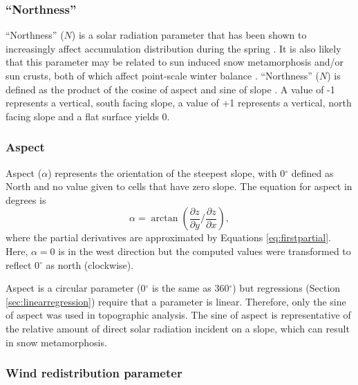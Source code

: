 \documentclass{sfuthesis}
\begin{document}
\subsubsection*{``Northness''} 

``Northness'' ($N$) is a solar radiation parameter that has been shown to  increasingly affect accumulation distribution during the spring \citep{Revuelto2014}. It is also likely that this parameter may be related to sun induced snow metamorphosis and/or sun crusts, both of which affect point-scale winter balance \citep{McGrath2015}. ``Northness'' ($N$) is defined as the product of the cosine of aspect and sine of slope \citep{Molotch2005}. A value of -1 represents a vertical, south facing slope, a value of +1 represents a vertical, north facing slope and a flat surface yields 0. 

\subsubsection*{Aspect} 

Aspect ($\alpha$) represents the orientation of the steepest slope, with 0${^\circ}$ defined as North and no value given to cells that have zero slope. The equation for aspect in degrees is \citep{Neteler2008}
	\begin{equation}
	\alpha = \arctan\left(\frac{\partial z}{\partial y} \bigg/ \frac{\partial z}{\partial x}\right), 
	\end{equation}
where the partial derivatives are approximated by Equations \ref{eq:firstpartial}. Here, $\alpha = 0$ is in the west direction but the computed values were transformed to reflect 0${^\circ}$ as north (clockwise). 

Aspect is a circular parameter (0${^\circ}$ is the same as 360${^\circ}$) but regressions (Section \ref{sec:linearregression}) require that a parameter is linear. Therefore, only the sine of aspect was used in topographic analysis. The sine of aspect is representative of the relative amount of direct solar radiation incident on a slope, which can result in snow metamorphosis. 

\subsubsection*{Wind redistribution parameter} 
\end{document}
